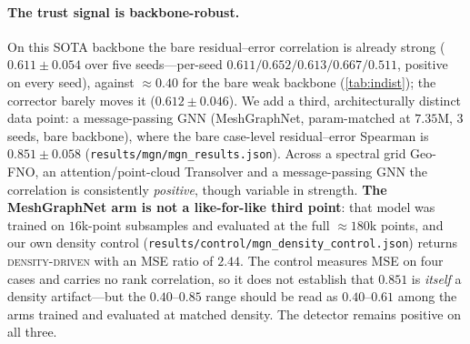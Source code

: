\paragraph{The trust signal is backbone-robust.} On this SOTA backbone the bare
residual--error correlation is already strong ($0.611{\pm}0.054$ over five
seeds---per-seed $0.611/0.652/0.613/0.667/0.511$, positive on every seed), against
$\approx 0.40$ for the bare weak backbone (\autoref{tab:indist}); the corrector barely
moves it ($0.612{\pm}0.046$). We add a third, architecturally distinct data point: a
message-passing GNN (MeshGraphNet, param-matched at $7.35$M, 3 seeds, bare backbone),
where the bare case-level residual--error Spearman is $0.851{\pm}0.058$
(\texttt{results/mgn/mgn\_results.json}). Across a spectral grid Geo-FNO, an
attention/point-cloud Transolver and a message-passing GNN the correlation is consistently
\emph{positive}, though variable in strength. \textbf{The MeshGraphNet arm is not a
like-for-like third point}: that model was trained on $16$k-point subsamples and evaluated
at the full $\approx180$k points, and our own density control
(\texttt{results/control/mgn\_density\_control.json}) returns \textsc{density-driven} with
an MSE ratio of $2.44$. The control measures MSE on four cases and carries no rank
correlation, so it does not establish that $0.851$ is \emph{itself} a density artifact---but
the $0.40$--$0.85$ range should be read as $0.40$--$0.61$ among the arms trained and
evaluated at matched density. The detector remains positive on all three.

